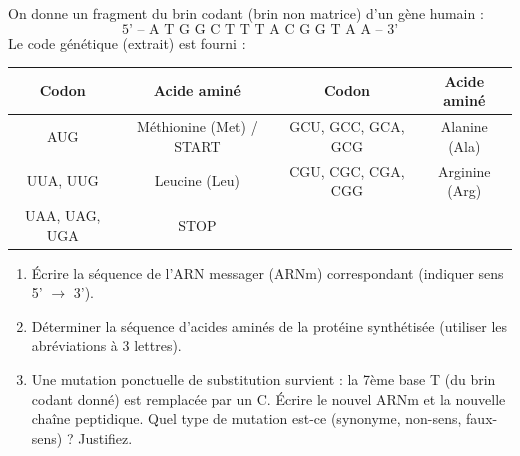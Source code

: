 \documentclass[11pt]{article}
\begin{document}
\begin{exercice}
On donne un fragment du brin codant (brin non matrice) d'un gène humain :
\[ \text{5' -- A T G  G C T  T T A  C G G  T A A -- 3'} \]
Le code génétique (extrait) est fourni :
\begin{center}
\begin{tabular}{|c|c|c|c|}\hline
Codon & Acide aminé & Codon & Acide aminé \\ \hline
AUG & Méthionine (Met) / START & GCU, GCC, GCA, GCG & Alanine (Ala) \\
UUA, UUG & Leucine (Leu) & CGU, CGC, CGA, CGG & Arginine (Arg) \\
UAA, UAG, UGA & STOP & & \\ \hline
\end{tabular}
\end{center}
\begin{enumerate}
    \item Écrire la séquence de l'ARN messager (ARNm) correspondant (indiquer sens 5' $\to$ 3').
    \item Déterminer la séquence d'acides aminés de la protéine synthétisée (utiliser les abréviations à 3 lettres).
    \item Une mutation ponctuelle de substitution survient : la 7ème base T (du brin codant donné) est remplacée par un C. Écrire le nouvel ARNm et la nouvelle chaîne peptidique. Quel type de mutation est-ce (synonyme, non-sens, faux-sens) ? Justifiez.
\end{enumerate}
\end{exercice}
\end{document}
